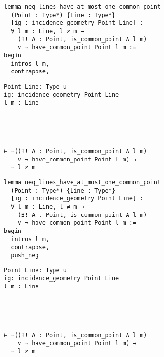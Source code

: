 \begin{frame}[fragile]
	\begin{multicols}{2}
		\begin{lstlisting}
lemma neq_lines_have_at_most_one_common_point 
  (Point : Type*) {Line : Type*} 
  [ig : incidence_geometry Point Line] :
  ∀ l m : Line, l ≠ m → 
    (∃! A : Point, is_common_point A l m) 
    ∨ ¬ have_common_point Point l m := 
begin
  intros l m,
  contrapose,
\end{lstlisting}
		\columnbreak
		\begin{lstlisting}
Point Line: Type u
ig: incidence_geometry Point Line
l m : Line





⊢ ¬((∃! A : Point, is_common_point A l m) 
    ∨ ¬ have_common_point Point l m) → 
  ¬ l ≠ m
		\end{lstlisting}
	\end{multicols}
\end{frame}










\begin{frame}[fragile]
	\begin{multicols}{2}
		\begin{lstlisting}
lemma neq_lines_have_at_most_one_common_point 
  (Point : Type*) {Line : Type*} 
  [ig : incidence_geometry Point Line] :
  ∀ l m : Line, l ≠ m → 
    (∃! A : Point, is_common_point A l m) 
    ∨ ¬ have_common_point Point l m := 
begin
  intros l m,
  contrapose,
  push_neg
\end{lstlisting}
		\columnbreak
		\begin{lstlisting}
Point Line: Type u
ig: incidence_geometry Point Line
l m : Line





⊢ ¬((∃! A : Point, is_common_point A l m) 
    ∨ ¬ have_common_point Point l m) → 
  ¬ l ≠ m
		\end{lstlisting}
	\end{multicols}
\end{frame}










